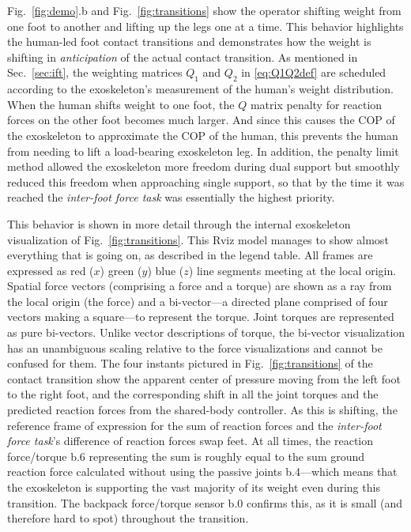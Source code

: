 \documentclass[utf8]{frontiersSCNS}
\begin{document}
Fig.~\ref{fig:demo}.b and Fig.~\ref{fig:transitions} show the operator shifting weight from one foot to another and lifting up the legs one at a time.
This behavior highlights the human-led foot contact transitions and demonstrates how the weight is shifting in \emph{anticipation} of the actual contact transition.
As mentioned in Sec.~\ref{sec:ift}, the weighting matrices $Q_1$ and $Q_2$ in \eqref{eq:Q1Q2def} are scheduled according to the exoskeleton's measurement of the human's weight distribution.
When the human shifts weight to one foot, the $Q$ matrix penalty for reaction forces on the other foot becomes much larger. And since this causes the COP of the exoskeleton to approximate the COP of the human, this prevents the human from needing to lift a load-bearing exoskeleton leg. In addition, the penalty limit method allowed the exoskeleton more freedom during dual support but smoothly reduced this freedom when approaching single support, so that by the time it was reached the \emph{inter-foot force task} was essentially the highest priority.
 
 This behavior is shown in more detail through the internal exoskeleton visualization of Fig.~\ref{fig:transitions}.
 This Rviz model manages to show almost everything that is going on, as described in the legend table.
 All frames are expressed as red ($x$) green ($y$) blue ($z$) line segments meeting at the local origin.
 Spatial force vectors (comprising a force and a torque) are shown as a ray from the local origin (the force) and a bi-vector---a directed plane comprised of four vectors making a square---to represent the torque. Joint torques are represented as pure bi-vectors.
 Unlike vector descriptions of torque, the bi-vector visualization has an unambiguous scaling relative to the force visualizations and cannot be confused for them.
 The four instants pictured in Fig.~\ref{fig:transitions} of the contact transition show the apparent center of pressure moving from the left foot to the right foot, and the corresponding shift in all the joint torques and the predicted reaction forces from the shared-body controller.
 As this is shifting, the reference frame of expression for the sum of reaction forces and the \emph{inter-foot force task}'s difference of reaction forces swap feet.
 At all times, the reaction force/torque b.6 representing the sum is roughly equal to the sum ground reaction force calculated without using the passive joints b.4---which means that the exoskeleton is supporting the vast majority of its weight even during this transition.
 The backpack force/torque sensor b.0 confirms this, as it is small (and therefore hard to spot) throughout the transition.
\end{document}

